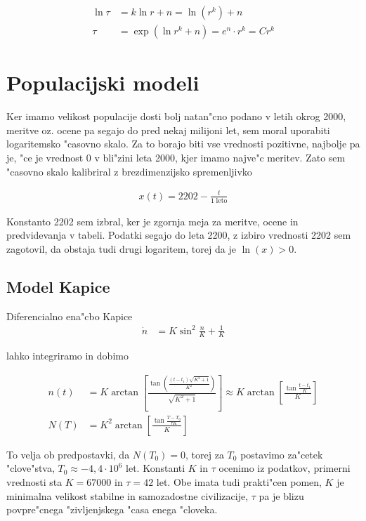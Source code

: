 \documentclass[a4paper,10pt]{article}
\begin{document}
\begin{align}
 \ln \tau &= k\ln r + n = \ln \left(r^k\right) + n \\
 \tau &= \exp\left(\ln r^k + n\right) = e^n \cdot r^k = Cr^k
\end{align}

\section{Populacijski modeli}

Ker imamo velikost populacije dosti bolj natan"cno podano v letih okrog 2000, meritve oz. ocene pa segajo do pred nekaj milijoni let, sem moral uporabiti logaritemsko "casovno skalo. Za to borajo biti vse vrednosti pozitivne, najbolje pa je, "ce je vrednost 0 v bli"zini leta 2000, kjer imamo najve"c meritev. Zato sem "casovno skalo kalibriral z brezdimenzijsko spremenljivko 

\begin{align}
 x(t) = 2202 - \frac{t}{\mathrm{1\; leto}}
\end{align}

Konstanto 2202 sem izbral, ker je zgornja meja za meritve, ocene in predvidevanja v tabeli. Podatki segajo do leta 2200, z izbiro vrednosti 2202 sem zagotovil, da obstaja tudi drugi logaritem, torej da je $\ln(x) > 0$. 

\subsection{Model Kapice}

Diferencialno ena"cbo Kapice 
\begin{align}
 \dot n &= K \sin^2 \frac{n}{K} + \frac{1}{K}
\end{align}

lahko integriramo in dobimo~\cite{seminar}

\begin{align}
n(t) &= K \arctan\left[\frac{\tan\left(\frac{(t-t_1)\sqrt{K^2+1}}{K^2}\right)}{\sqrt{K^2+1}}\right] \approx K\arctan\left[ \frac{\tan \frac{t-t_1}{K}}{K} \right] \\
N(T) &= K^2 \arctan\left[ \frac{\tan \frac{T-T_0}{\tau K}}{K}\right]
\end{align}

To velja ob predpostavki, da $N(T_0) = 0$, torej za $T_0$ postavimo za"cetek "clove"stva, $T_0\approx -4,4\cdot10^6$ let. Konstanti $K$ in $\tau$ ocenimo iz podatkov, primerni vrednosti sta $K=67000$ in $\tau = 42$ let. Obe imata tudi prakti"cen pomen, $K$ je minimalna velikost stabilne in samozadostne civilizacije, $\tau$ pa je blizu povpre"cnega "zivljenjskega "casa enega "cloveka.
\end{document}
